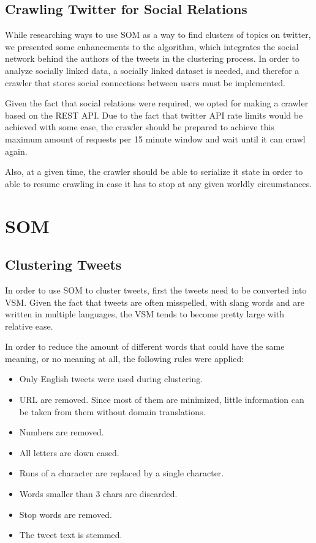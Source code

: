 \subsection{Crawling Twitter for Social Relations}
\label{sub:crawling_twitter_for_social_relations}
While researching ways to use \ac{SOM} as a way to find clusters of topics on twitter, we presented some enhancements to the algorithm, which integrates the social network behind the authors of the tweets in the clustering process. In order to analyze socially linked data, a socially linked dataset is needed, and therefor a crawler that stores social connections between users must be implemented.   

Given the fact that social relations were required, we opted for making a crawler based on the REST API. Due to the fact that twitter API rate limits would be achieved with some ease, the crawler should be prepared to achieve this maximum amount of requests per 15 minute window and wait until it can crawl again. 

Also, at a given time, the crawler should be able to serialize it state in order to able to resume crawling in case it has to stop at any given worldly circumstances. 

\section{SOM}

\subsection{Clustering Tweets}
\label{sub:clustering_tweets}

In order to use \ac{SOM} to cluster tweets, first the tweets need to be converted into \ac{VSM}. Given the fact that tweets are often misspelled, with slang words and are written in multiple languages, the \ac{VSM} tends to become pretty large with relative ease. 

In order to reduce the amount of different words that could have the same meaning, or no meaning at all, the following rules were applied:

\begin{itemize}
  \item Only English tweets were used during clustering.
  \item \ac{URL} are removed. Since most of them are minimized, little information can be taken from them without domain translations.
  \item Numbers are removed.
  \item All letters are down cased.
  \item Runs of a character are replaced by a single character.
  \item Words smaller than 3 chars are discarded.
  \item Stop words are removed. 
  \item The tweet text is stemmed.
\end{itemize}

